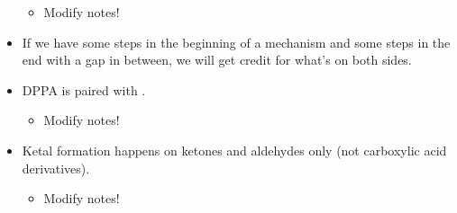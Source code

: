 \documentclass[../notes.tex]{subfiles}
\begin{document}
\begin{itemize}
    \begin{itemize}
        \item Modify notes!
    \end{itemize}
    \item If we have some steps in the beginning of a mechanism and some steps in the end with a gap in between, we will get credit for what's on both sides.
    \item DPPA is paired with .
    \begin{itemize}
        \item Modify notes!
    \end{itemize}
    \item Ketal formation happens on ketones and aldehydes only (not carboxylic acid derivatives).
    \begin{itemize}
        \item Modify notes!
    \end{itemize}
\end{itemize}
\end{document}
